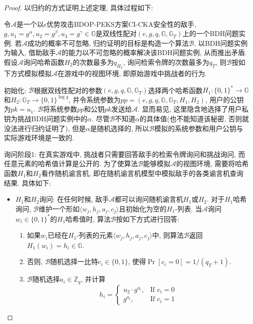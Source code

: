 \begin{proof}
以归约的方式证明上述定理, 具体过程如下:

令$\mathcal{A}$是一个以$\epsilon$优势攻击BDOP-PEKS方案CI-CKA安全性的敌手, $g, u_1 = g^\alpha, u_2 = g^\beta, u_3 = g^\gamma \in \mathbb{G}$是双线性配对$(e, g, q, \mathbb{G}, \mathbb{G}_T)$上的一个BDH问题实例. 若$\mathcal{A}$成功的概率不可忽略, 归约证明的目标是构造一个算法$\mathcal{B}$, 以BDH问题实例为输入, 借助敌手$\mathcal{A}$的能力以不可忽略的概率解决该BDH问题实例, 从而推出矛盾. 假设$\mathcal{A}$询问哈希函数$H_2$的次数最多为$q_{H_2}$, 询问检索令牌的次数最多为$q_T$, 则$\mathcal{B}$按如下方式模拟模拟$\mathcal{A}$在游戏中的视图环境, 即原始游戏中挑战者的行为.
\begin{trivlist}
\item 初始化: $\mathcal{B}$根据双线性配对的参数$(e, g, q, \mathbb{G}, \mathbb{G}_T)$选择两个哈希函数$H_1: \{0, 1\}^* \rightarrow \mathbb{G}$和$H_2: \mathbb{G}_T \rightarrow \{0, 1\}^{\log q}$, 并令系统参数为$pp = (e, g, q, \mathbb{G}, \mathbb{G}_T, H_1, H_2)$, 用户的公钥为$pk = u_1$. $\mathcal{B}$将系统参数$pp$和公钥$pk$发送给$\mathcal{A}$. 显而易见, 这里隐含地选择了用户私钥为挑战BDH问题实例中的$\alpha$. 尽管$\mathcal{B}$不知道$\alpha$的具体值(也不能知道该秘密, 否则就没法进行归约证明了), 但是$\alpha$是随机选择的, 所以$\mathcal{B}$模拟的系统参数和用户公钥与实际游戏环境是一致的.

\item 询问阶段1: 在真实游戏中, 挑战者只需要回答敌手的检索令牌询问和挑战询问, 而任意元素的哈希值计算是公开的. 为了使算法$\mathcal{B}$能够模拟$\mathcal{A}$的视图环境, 需要将哈希函数$H_1$和$H_2$看作随机谕言机, 即在随机谕言机模型中模拟敌手的各类谕言机查询结果. 具体如下:
\begin{itemize}
\item $H_1$和$H_2$询问: 在任何时候, 敌手$\mathcal{A}$都可以询问随机谕言机$H_1$或$H_2$. 对于$H_1$哈希询问, $\mathcal{B}$维护一个形如$\langle w_j, h_j, a_j, c_j\rangle$且初始化为空的$H_1$-列表. 当$\mathcal{A}$询问$w_i \in \{0, 1\}^*$的$H_1$哈希值时, 算法$\mathcal{B}$按如下方式进行回答:
\begin{enumerate}
\item 如果$w_i$已经在$H_1$-列表的元素$\langle w_j, h_j, a_j, c_j\rangle$中, 则算法$\mathcal{B}$返回$H_1(w_i) = h_i \in \mathbb{G}$.

\item 否则, $\mathcal{B}$随机选择一比特$c_i \in \{0, 1\}$, 使得$\Pr[c_i = 0] = 1/(q_T +1)$.

\item $\mathcal{B}$随机选择$a_i \in \mathbb{Z}_q$, 并计算
\[
h_i = \left\{
\begin{array}{ll}
u_2 \cdot g^{a_i}, & \text{If $c_i = 0$}\\
g^{a_i},           & \text{If $c_i = 1$}
\end{array}
\right.
\]


\end{enumerate}
\end{itemize}
\end{trivlist}
\end{proof}
